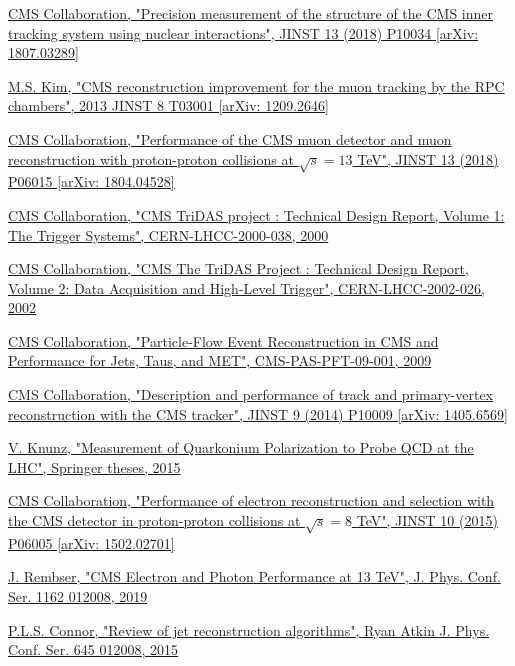 \documentclass[a4paper, 10pt, openright]{report}
\begin{document}
\begin{thebibliography}{1}
\href{https://arxiv.org/abs/1807.03289}{CMS Collaboration,
"Precision measurement of the structure of the CMS inner tracking system using nuclear interactions",
JINST 13 (2018) P10034 [arXiv: 1807.03289]
}

\href{https://arxiv.org/abs/1209.2646}{M.S. Kim,
"CMS reconstruction improvement for the muon tracking by the RPC chambers",
2013 JINST 8 T03001 [arXiv: 1209.2646]}

\href{https://arxiv.org/abs/1804.04528}{CMS Collaboration,
"Performance of the CMS muon detector and muon reconstruction with proton-proton collisions at $\sqrt{s} = 13$ TeV",
JINST 13 (2018) P06015 [arXiv: 1804.04528]}

\href{http://cdsweb.cern.ch/record/706847}{CMS Collaboration,
"CMS TriDAS project : Technical Design Report, Volume 1: The Trigger Systems",
CERN-LHCC-2000-038, 2000}

\href{http://cdsweb.cern.ch/record/578006}{CMS Collaboration,
"CMS The TriDAS Project : Technical Design Report, Volume 2: Data Acquisition and High-Level Trigger",
CERN-LHCC-2002-026, 2002}

\href{http://inspirehep.net/record/925379/}{CMS Collaboration,
"Particle-Flow Event Reconstruction in CMS and Performance for Jets, Taus, and MET",
CMS-PAS-PFT-09-001, 2009}

\href{https://arxiv.org/abs/1405.6569}{CMS Collaboration,
"Description and performance of track and primary-vertex reconstruction with the CMS tracker",
JINST 9 (2014) P10009 [arXiv: 1405.6569]}

\href{http://inspirehep.net/record/1381380}{V. Knunz,
"Measurement of Quarkonium Polarization to Probe QCD at the LHC",
Springer theses, 2015}

\href{https://arxiv.org/abs/1502.02701}{CMS Collaboration,
"Performance of electron reconstruction and selection with the CMS detector in proton-proton collisions at $\sqrt{s} = 8$ TeV",
JINST 10 (2015) P06005 [arXiv: 1502.02701]}

\href{https://iopscience.iop.org/article/10.1088/1742-6596/1162/1/012008/pdf}{J. Rembser,
"CMS Electron and Photon Performance at 13 TeV",
J. Phys. Conf. Ser. 1162 012008, 2019}

\href{https://iopscience.iop.org/article/10.1088/1742-6596/645/1/012008/pdf}{P.L.S. Connor,
"Review of jet reconstruction algorithms",
Ryan Atkin J. Phys. Conf. Ser. 645 012008, 2015}


\end{thebibliography}
\end{document}
